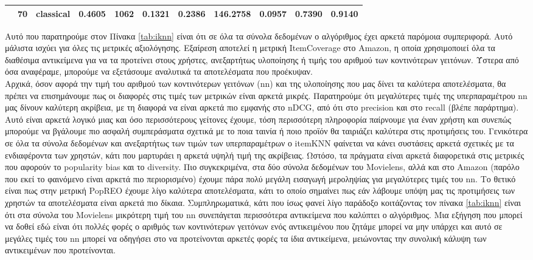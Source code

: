 \begin{table}[H]
{\begin{tabular}{lllrrrrrrrr}
			& 70 & classical & {\cellcolor[HTML]{F0F0F3}} \color[HTML]{000000} 0.4605 & {\cellcolor[HTML]{E9E9F3}} \color[HTML]{000000} 1062 & {\cellcolor[HTML]{C5C5F5}} \color[HTML]{000000} 0.1321 & {\cellcolor[HTML]{F0F0F3}} \color[HTML]{000000} 0.2386 & {\cellcolor[HTML]{0000FF}} \color[HTML]{F1F1F1} 146.2758 & {\cellcolor[HTML]{EDEDF3}} \color[HTML]{000000} 0.0957 & {\cellcolor[HTML]{2F2FFD}} \color[HTML]{F1F1F1} 0.7390 & {\cellcolor[HTML]{0000FF}} \color[HTML]{F1F1F1} 0.9140 \\
			\bottomrule[2.5pt] \end{tabular}
	}
\end{table}
\noindent Αυτό που παρατηρούμε στον Πίνακα \ref{tab:iknn} είναι ότι σε όλα τα σύνολα δεδομένων ο αλγόριθμος έχει αρκετά παρόμοια συμπεριφορά. Αυτό μάλιστα ισχύει για όλες τις μετρικές αξιολόγησης. Εξαίρεση αποτελεί η μετρική ItemCoverage στο Amazon, η οποία χρησιμοποιεί όλα τα διαθέσιμα αντικείμενα για να τα προτείνει στους χρήστες, ανεξαρτήτως υλοποίησης ή τιμής του αριθμού των κοντινότερων γειτόνων. Ύστερα από όσα αναφέραμε, μπορούμε να εξετάσουμε αναλυτικά τα αποτελέσματα που προέκυψαν.\\ Αρχικά, όσον αφορά την τιμή του αριθμού των κοντινότερων γειτόνων (nn) και της υλοποίησης που μας δίνει τα καλύτερα αποτελέσματα, θα πρέπει να επισημάνουμε πως οι διαφορές στις τιμές των μετρικών είναι αρκετά μικρές. Παρατηρούμε ότι μεγαλύτερες τιμές της υπερπαραμέτρου nn μας δίνουν καλύτερη ακρίβεια, με τη διαφορά να είναι αρκετά πιο εμφανής στο nDCG, από ότι στο precision και στο recall (βλέπε παράρτημα). Αυτό είναι αρκετά λογικό μιας και όσο περισσότερους γείτονες έχουμε, τόση περισσότερη πληροφορία παίρνουμε για έναν χρήστη και συνεπώς μπορούμε να βγάλουμε πιο ασφαλή συμπεράσματα σχετικά με το ποια ταινία ή ποιο προϊόν θα ταιριάζει καλύτερα στις προτιμήσεις του. Γενικότερα σε όλα τα σύνολα δεδομένων και ανεξαρτήτως των τιμών των υπερπαραμέτρων ο itemKNN φαίνεται να κάνει συστάσεις αρκετά σχετικές με τα ενδιαφέροντα των χρηστών, κάτι που μαρτυράει η αρκετά υψηλή τιμή της ακρίβειας. Ωστόσο, τα πράγματα είναι αρκετά διαφορετικά στις μετρικές που αφορούν το popularity bias και το diversity. Πιο συγκεκριμένα, στα δύο σύνολα δεδομένων του Movielens, αλλά και στο Amazon (παρόλο που εκεί το φαινόμενο είναι αρκετά πιο περιορισμένο) έχουμε πάρα πολύ μεγάλη εισαγωγή μεροληψίας για μεγαλύτερες τιμές του nn. Το θετικό είναι πως στην μετρική PopREO έχουμε λίγο καλύτερα αποτελέσματα, κάτι το οποίο σημαίνει πως εάν λάβουμε υπόψη μας τις προτιμήσεις των χρηστών τα αποτελέσματα είναι αρκετά πιο δίκαια. Συμπληρωματικά, κάτι που ίσως φανεί λίγο παράδοξο κοιτάζοντας τον πίνακα \ref{tab:iknn} είναι ότι στα σύνολα του Movielens μικρότερη τιμή του nn συνεπάγεται περισσότερα αντικείμενα που καλύπτει ο αλγόριθμος. Μια εξήγηση που μπορεί να δοθεί εδώ είναι ότι πολλές φορές ο αριθμός των κοντινότερων γειτόνων ενός αντικειμένου που ζητάμε μπορεί να μην υπάρχει και αυτό σε μεγάλες τιμές του nn μπορεί να οδηγήσει στο να προτείνονται αρκετές φορές τα ίδια αντικείμενα, μειώνοντας την συνολική κάλυψη των αντικειμένων που προτείνονται. \\
